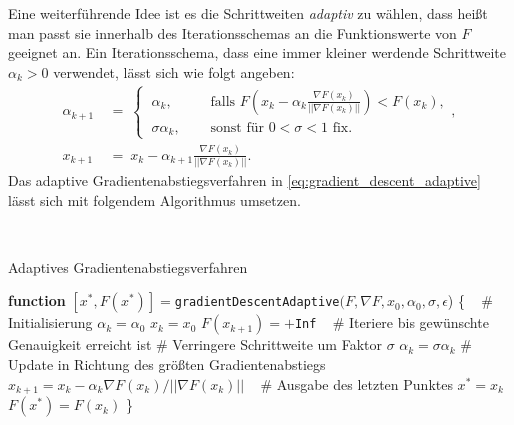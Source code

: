 Eine weiterführende Idee ist es die Schrittweiten \textit{adaptiv} zu wählen, dass heißt man passt sie innerhalb des Iterationsschemas an die Funktionswerte von $F$ geeignet an.
Ein Iterationsschema, dass eine immer kleiner werdende Schrittweite $\alpha_k > 0$ verwendet, lässt sich wie folgt angeben:
\begin{equation}
\label{eq:gradient_descent_adaptive}
\begin{split}
\alpha_{k+1} \ &= \
\begin{cases}
\ \alpha_k, \quad &\text{ falls } F\left(x_k - \alpha_k \frac{\nabla F(x_k)}{||\nabla F(x_k)||}\right) < F(x_k) , \\
\ \sigma \alpha_k, \quad &\text{ sonst für } 0 < \sigma < 1 \text{ fix}.
\end{cases},\\
x_{k+1} \ &= \ x_k - \alpha_{k+1} \frac{\nabla F(x_k)}{||\nabla F(x_k)||}.
\end{split}
\end{equation}
Das adaptive Gradientenabstiegsverfahren in \eqref{eq:gradient_descent_adaptive} lässt sich mit folgendem Algorithmus umsetzen.

~\\
\begin{algorithm}{Adaptives Gradientenabstiegsverfahren}{}
\label{alg:gradient_descent_adaptive}
\begin{algorithmic}
\STATE \textbf{function} $[x^*, F(x^*)]= $\texttt{gradientDescentAdaptive}$(F,\nabla F, x_0, \alpha_0, \sigma, \epsilon$) \{
\STATE ~
\STATE \# Initialisierung
\STATE $\alpha_k = \alpha_0$
\STATE $x_k = x_0$
\STATE $F(x_{k+1}) = +$\texttt{Inf}
\STATE ~
\STATE \# Iteriere bis gewünschte Genauigkeit erreicht ist
\STATE \# Verringere Schrittweite um Faktor $\sigma$
\STATE $\alpha_k = \sigma\alpha_k$
\ENDWHILE
\STATE \# Update in Richtung des größten Gradientenabstiegs
\STATE $x_{k+1} = x_k - \alpha_k\nabla F(x_k)/||\nabla F(x_k)||$
\ENDWHILE
\STATE ~
\STATE \# Ausgabe des letzten Punktes
\STATE $x^* = x_k$
\STATE $F(x^*) = F(x_k)$
\STATE \}
\end{algorithmic}
\end{algorithm}

